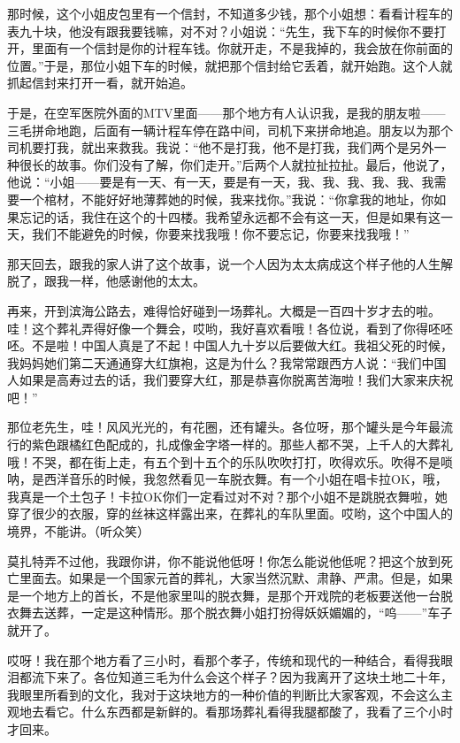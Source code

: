 \par 那时候，这个小姐皮包里有一个信封，不知道多少钱，那个小姐想：看看计程车的表九十块，他没有跟我要钱嘛，对不对？小姐说：“先生，我下车的时候你不要打开，里面有一个信封是你的计程车钱。你就开走，不是我掉的，我会放在你前面的位置。”于是，那位小姐下车的时候，就把那个信封给它丢着，就开始跑。这个人就抓起信封来打开一看，就开始追。
\par 于是，在空军医院外面的MTV里面——那个地方有人认识我，是我的朋友啦——三毛拼命地跑，后面有一辆计程车停在路中间，司机下来拼命地追。朋友以为那个司机要打我，就出来救我。我说：“他不是打我，他不是打我，我们两个是另外一种很长的故事。你们没有了解，你们走开。”后两个人就拉扯拉扯。最后，他说了，他说：“小姐——要是有一天、有一天，要是有一天，我、我、我、我、我、我需要一个棺材，不能好好地薄葬她的时候，我来找你。”我说：“你拿我的地址，你如果忘记的话，我住在这个的十四楼。我希望永远都不会有这一天，但是如果有这一天，我们不能避免的时候，你要来找我哦！你不要忘记，你要来找我哦！”
\par 那天回去，跟我的家人讲了这个故事，说一个人因为太太病成这个样子他的人生解脱了，跟我一样，他感谢他的太太。
\par 再来，开到滨海公路去，难得恰好碰到一场葬礼。大概是一百四十岁才去的啦。哇！这个葬礼弄得好像一个舞会，哎哟，我好喜欢看哦！各位说，看到了你得呸呸呸。不是啦！中国人真是了不起！中国人九十岁以后要做大红。我祖父死的时候，我妈妈她们第二天通通穿大红旗袍，这是为什么？我常常跟西方人说：“我们中国人如果是高寿过去的话，我们要穿大红，那是恭喜你脱离苦海啦！我们大家来庆祝吧！”
\par 那位老先生，哇！风风光光的，有花圈，还有罐头。各位呀，那个罐头是今年最流行的紫色跟橘红色配成的，扎成像金字塔一样的。那些人都不哭，上千人的大葬礼哦！不哭，都在街上走，有五个到十五个的乐队吹吹打打，吹得欢乐。吹得不是唢呐，是西洋音乐的时候，我忽然看见一车脱衣舞。有一个小姐在唱卡拉OK，哦，我真是一个土包子！卡拉OK你们一定看过对不对？那个小姐不是跳脱衣舞啦，她穿了很少的衣服，穿的丝袜这样露出来，在葬礼的车队里面。哎哟，这个中国人的境界，不能讲。（听众笑）
\par 莫扎特弄不过他，我跟你讲，你不能说他低呀！你怎么能说他低呢？把这个放到死亡里面去。如果是一个国家元首的葬礼，大家当然沉默、肃静、严肃。但是，如果是一个地方上的首长，不是他家里叫的脱衣舞，是那个开戏院的老板要送他一台脱衣舞去送葬，一定是这种情形。那个脱衣舞小姐打扮得妖妖媚媚的，“呜——”车子就开了。
\par 哎呀！我在那个地方看了三小时，看那个孝子，传统和现代的一种结合，看得我眼泪都流下来了。各位知道三毛为什么会这个样子？因为我离开了这块土地二十年，我眼里所看到的文化，我对于这块地方的一种价值的判断比大家客观，不会这么主观地去看它。什么东西都是新鲜的。看那场葬礼看得我腿都酸了，我看了三个小时才回来。

